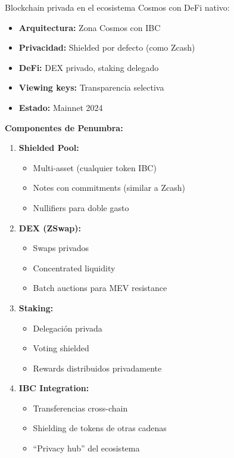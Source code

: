 \documentclass[11pt,a4paper,twoside]{book}
\begin{document}
\begin{definition}[Penumbra]
Blockchain privada en el ecosistema Cosmos con DeFi nativo:
\begin{itemize}
    \item \textbf{Arquitectura:} Zona Cosmos con IBC
    \item \textbf{Privacidad:} Shielded por defecto (como Zcash)
    \item \textbf{DeFi:} DEX privado, staking delegado
    \item \textbf{Viewing keys:} Transparencia selectiva
    \item \textbf{Estado:} Mainnet 2024
\end{itemize}
\end{definition}

\begin{mathnote}
\textbf{Componentes de Penumbra:}

\begin{enumerate}
    \item \textbf{Shielded Pool:}
    \begin{itemize}
        \item Multi-asset (cualquier token IBC)
        \item Notes con commitments (similar a Zcash)
        \item Nullifiers para doble gasto
    \end{itemize}
    
    \item \textbf{DEX (ZSwap):}
    \begin{itemize}
        \item Swaps privados
        \item Concentrated liquidity
        \item Batch auctions para MEV resistance
    \end{itemize}
    
    \item \textbf{Staking:}
    \begin{itemize}
        \item Delegaci\'on privada
        \item Voting shielded
        \item Rewards distribuidos privadamente
    \end{itemize}
    
    \item \textbf{IBC Integration:}
    \begin{itemize}
        \item Transferencias cross-chain
        \item Shielding de tokens de otras cadenas
        \item ``Privacy hub'' del ecosistema
    \end{itemize}
\end{enumerate}
\end{mathnote}
\end{document}
